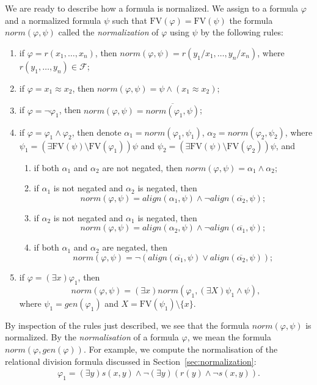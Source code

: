 \documentclass{lmcs}
\def\F{\mathcal F}
\def\norm{norm}
\def\al{align}
\def\FV{\textrm{FV}}
\def\gen{gen}
\begin{document}
We are ready to describe how a formula is normalized.
We assign to a formula $\varphi$ and a normalized formula $\psi$ such that $\FV(\varphi)=\FV(\psi)$ the formula $\norm(\varphi,\psi)$ called the \emph{normalization} of $\varphi$ using $\psi$ by the following rules:
\begin{enumerate}
\item if $\varphi=r(x_1,\ldots,x_n)$, then $\norm(\varphi,\psi)=r(y_1/x_1,\ldots,y_n/x_n)$, where $r(y_1,\ldots,y_n)\in\F$; 
\item if $\varphi=x_1\approx x_2$, then $\norm(\varphi,\psi)=\psi\wedge(x_1\approx x_2)$;
\item if $\varphi=\neg\varphi_1$, then $\norm(\varphi,\psi)=\overline{\norm(\varphi_1,\psi)}$;
\item if $\varphi=\varphi_1\wedge\varphi_2$, then denote $\alpha_1=\norm(\varphi_1,\psi_1)$, $\alpha_2=\norm(\varphi_2,\psi_2)$, where $\psi_1=(\exists\FV(\psi)\setminus\FV(\varphi_1))\psi$ and $\psi_2=(\exists\FV(\psi)\setminus\FV(\varphi_2))\psi$, and 
\begin{enumerate}
\item  if both $\alpha_1$ and $\alpha_2$ are not negated, then $\norm(\varphi,\psi)=\alpha_1\wedge\alpha_2$;
\item  if  $\alpha_1$ is not negated and $\alpha_2$ is negated, then 
$$\norm(\varphi,\psi)=\al(\alpha_1,\psi)\wedge\neg\al(\overline{\alpha_2},\psi);$$ 
\item if  $\alpha_2$ is not negated and $\alpha_1$ is negated, then 
$$\norm(\varphi,\psi)=\al(\alpha_2,\psi)\wedge\neg\al(\overline{\alpha_1},\psi);$$

\item  if both $\alpha_1$  and $\alpha_2$ are negated, then 
$$\norm(\varphi,\psi)=\neg(\al(\overline{\alpha_1},\psi)\vee\al(\overline{\alpha_2},\psi));$$
\end{enumerate}
\item if $\varphi=(\exists x)\varphi_1$, then
$$\norm(\varphi,\psi)=(\exists x)\norm(\varphi_1,(\exists X)\psi_1\wedge\psi),$$
where $\psi_1=\gen(\varphi_1)$ and $X=\FV(\psi_1)\setminus\{x\}$.
\end{enumerate}
By inspection of the rules just described, we see that the formula $\norm(\varphi,\psi)$ is normalized. By the \emph{normalisation} of a formula $\varphi$, we mean the formula $\norm(\varphi,\gen(\varphi))$. For example, we compute the normalisation of the relational division formula discussed in Section~\ref{sec:normalization}:
\begin{align}
\varphi_1=(\exists y)s(x,y)\wedge\neg(\exists y)(r(y)\wedge\neg s(x,y)).
\end{align}
\end{document}

